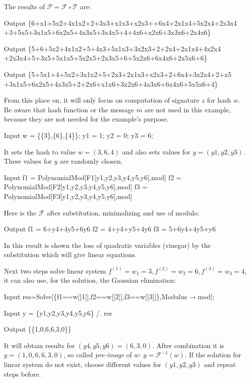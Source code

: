 \documentclass[thesis=M,english]{FITthesis}[2019/12/23]
\begin{document}
\noindent
The results of $\mathcal{P} = \mathcal{F} \circ \mathcal{T}$ are:
\begin{mmaCell}[addtoindex=3,leftmargin=1em]{Output}
\{6+x1+5x2+4x1x2+2+3x3+x1x3+x2x3++6x4+2x1x4+5x2x4+2x3x4
+3+5x5+3x1x5+6x2x5+4x3x5+3x4x5+4+4x6+x2x6+3x3x6+2x4x6\}
\end{mmaCell}
\begin{mmaCell}[leftmargin=1em]{Output}
\{5+6+5x2+4x1x2+5+4x3+5x1x3+3x2x3+2+2x4+2x1x4+4x2x4
+2x3x4+5+3x5+5x1x5+5x2x5+2x3x5+6+5x2x6+6x4x6+2x5x6+6\}
\end{mmaCell}
\begin{mmaCell}[leftmargin=1em]{Output}
\{5+5x1+4+5x2+3x1x2+5+2x3+2x1x3+x2x3+2+6x4+3x2x4+2+x5
+3x1x5+6x2x5+4x3x5+2+2x6+x1x6+3x2x6+4x3x6+6x4x6+5x5x6+4\}
\end{mmaCell}
From this place on, it will only focus on computation of signature $z$ for hash $w$. Be aware that hash function or the message $m$ are not used in this example, because they are not needed for the example's purpose.
\begin{mmaCell}[moredefined={w, y1, y2, y3}]{Input}
w = \{\{3\},\{6\},\{4\}\};
y1 = 1;
y2 = 0;
y3 = 6;
\end{mmaCell}
It sets the hash to value $w = (3,6,4)$ and also sets values for $y = (y1,y2,y3)$. These values for $y$ are randomly chosen.
\begin{mmaCell}[addtoindex=3,moredefined={f1, F1, y1, y2, y3, mod, f2, F2, f3, F3}]{Input}
f1 = PolynomialMod[F1[y1,y2,y3,y4,y5,y6],mod]
f2 = PolynomialMod[F2[y1,y2,y3,y4,y5,y6],mod]
f3 = PolynomialMod[F3[y1,y2,y3,y4,y5,y6],mod]
\end{mmaCell}
Here is the $\mathcal{F}$ after substitution, minimalizing and use of modulo:
\begin{mmaCell}{Output}
f1 = 6+y4+4y5+6y6
f2 = 4+y4+y5+4y6
f3 = 5+6y4+4y5+y6
\end{mmaCell}
In this result is shown the loss of quadratic variables (vinegar) by the substitution which will give linear equations.

\bigskip
\noindent
Next two steps solve linear system $f^{(1)} = w_1 = 3, f^{(2)} = w_2 = 6, f^{(3)} = w_3 = 4$, it can also use, for the solution, the Gaussian elimination:
\begin{mmaCell}[moredefined={res, f1, w, f2, f3, mod}]{Input}
res=Solve[\{f1==w[[1]],f2==w[[2]],f3==w[[3]]\},Modulus\(\pmb{\to}\)mod];
\end{mmaCell}
\begin{mmaCell}[moredefined={y, y1, y2, y3, res}]{Input}
y = \{y1,y2,y3,y4,y5,y6\} /. res
\end{mmaCell}
\begin{mmaCell}{Output}
\{\{1,0,6,6,3,0\}\}
\end{mmaCell}
It will obtain results for $(y4,y5,y6) = (6,3,0)$. After combination it is $y = (1,0,6,6,3,0)$, so called \textit{pre-image} of $w$: $y = \mathcal{F}^{-1}(w)$. If the solution for linear system do not exist, choose different values for $(y1,y2,y3)$ and repeat steps before.
\end{document}
